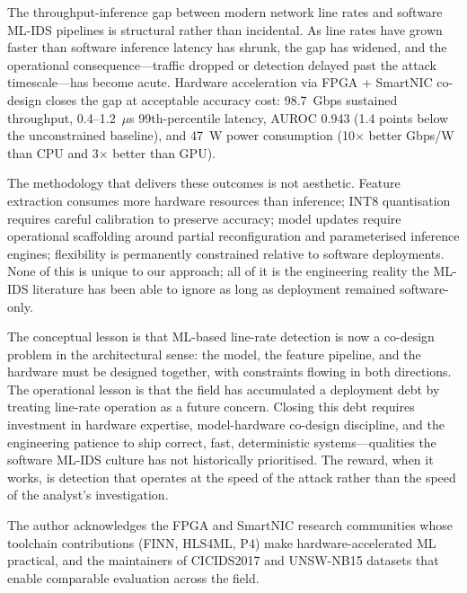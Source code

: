 \documentclass[sigconf,nonacm]{acmart}
\begin{document}
The throughput-inference gap between modern network line rates and
software ML-IDS pipelines is structural rather than incidental. As line
rates have grown faster than software inference latency has shrunk,
the gap has widened, and the operational consequence---traffic dropped
or detection delayed past the attack timescale---has become acute.
Hardware acceleration via FPGA + SmartNIC co-design closes the gap
at acceptable accuracy cost: 98.7~Gbps sustained throughput, 0.4--1.2~$\mu$s
99th-percentile latency, AUROC 0.943 (1.4 points below the unconstrained
baseline), and 47~W power consumption (10$\times$ better Gbps/W than
CPU and 3$\times$ better than GPU).

The methodology that delivers these outcomes is not aesthetic. Feature
extraction consumes more hardware resources than inference; INT8
quantisation requires careful calibration to preserve accuracy; model
updates require operational scaffolding around partial reconfiguration
and parameterised inference engines; flexibility is permanently
constrained relative to software deployments. None of this is
unique to our approach; all of it is the engineering reality the
ML-IDS literature has been able to ignore as long as deployment
remained software-only.

The conceptual lesson is that ML-based line-rate detection is now a
co-design problem in the architectural sense: the model, the feature
pipeline, and the hardware must be designed together, with constraints
flowing in both directions. The operational lesson is that the field
has accumulated a deployment debt by treating line-rate operation as
a future concern. Closing this debt requires investment in hardware
expertise, model-hardware co-design discipline, and the engineering
patience to ship correct, fast, deterministic systems---qualities the
software ML-IDS culture has not historically prioritised. The reward,
when it works, is detection that operates at the speed of the
attack rather than the speed of the analyst's investigation.

\begin{acks}
The author acknowledges the FPGA and SmartNIC research communities
whose toolchain contributions (FINN, HLS4ML, P4) make hardware-accelerated
ML practical, and the maintainers of CICIDS2017 and UNSW-NB15 datasets
that enable comparable evaluation across the field.
\end{acks}
\end{document}
